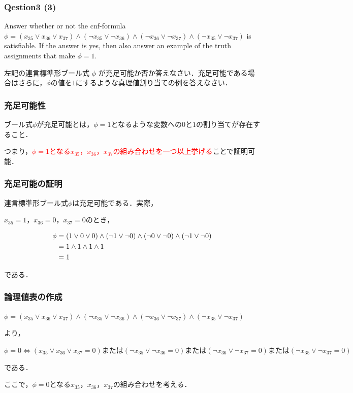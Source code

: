 \begin{frame}

\frametitle{Qestion3 (3)}

Answer whether or not the cnf-formula $\phi = (x_{35}\lor x_{36}\lor x_{37}) \land (\lnot x_{35}\lor\lnot x_{36}) \land (\lnot x_{36}\lor\lnot x_{37}) \land (\lnot x_{35}\lor\lnot x_{37})$ is satisfiable.  If the answer is yes, then also answer an example of the truth assignments that make $\phi=1$.  

左記の連言標準形ブール式 $\phi$ が充足可能か否か答えなさい．充足可能である場合はさらに，$\phi$の値を$1$にするような真理値割り当ての例を答えなさい．

\end{frame}

\begin{frame}

\frametitle{充足可能性}

ブール式$\phi$が充足可能とは，$\phi=1$となるような変数への$0$と$1$の割り当てが存在すること．

つまり，\textcolor{red}{$\phi=1$となる$x_{35}$，$x_{36}$，$x_{37}$の組み合わせを一つ以上挙げる}ことで証明可能．

\end{frame}

\begin{frame}

\frametitle{充足可能の証明}

連言標準形ブール式$\phi$は充足可能である．実際，

$x_{35}=1$，$x_{36}=0$，$x_{37}=0$のとき，

\begin{align}\displaystyle
\phi &= (1\lor0\lor0) \land (\lnot1\lor\lnot0) \land (\lnot0\lor\lnot0) \land (\lnot1\lor\lnot0) \notag \\
&= 1 \land 1 \land 1 \land 1 \notag \\
&= 1\notag
\end{align}

である．

\end{frame}

\begin{frame}

\frametitle{論理値表の作成}

$\phi = (x_{35}\lor x_{36}\lor x_{37}) \land (\lnot x_{35}\lor\lnot x_{36}) \land (\lnot x_{36}\lor\lnot x_{37}) \land (\lnot x_{35}\lor\lnot x_{37})$

より，

$\phi=0 \Leftrightarrow (x_{35}\lor x_{36}\lor x_{37}=0) \text{または} (\lnot x_{35}\lor\lnot x_{36}=0) \text{または} (\lnot x_{36}\lor\lnot x_{37}=0) \text{または} (\lnot x_{35}\lor\lnot x_{37}=0)$

である．

ここで，$\phi=0$となる$x_{35}$，$x_{36}$，$x_{37}$の組み合わせを考える．

\end{frame}

